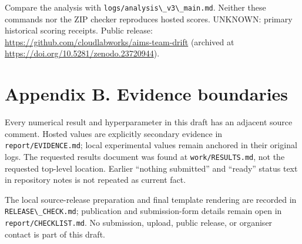 \documentclass{article}
\providecommand{\passthrough}[1]{#1}
\begin{document}
Compare the analysis with \passthrough{\lstinline!logs/analysis\_v3\_main.md!}. Neither these commands nor the ZIP checker reproduces hosted scores. UNKNOWN: primary historical scoring receipts. Public release: \url{https://github.com/cloudlabworks/aims-team-drift} (archived at \url{https://doi.org/10.5281/zenodo.23720944}).

\section{Appendix B. Evidence boundaries}\label{appendix-b.-evidence-boundaries}

Every numerical result and hyperparameter in this draft has an adjacent source comment. Hosted values are explicitly secondary evidence in \passthrough{\lstinline!report/EVIDENCE.md!}; local experimental values remain anchored in their original logs. The requested results document was found at \passthrough{\lstinline!work/RESULTS.md!}, not the requested top-level location. Earlier ``nothing submitted'' and ``ready'' status text in repository notes is not repeated as current fact.

The local source-release preparation and final template rendering are recorded in \passthrough{\lstinline!RELEASE\_CHECK.md!}; publication and submission-form details remain open in \passthrough{\lstinline!report/CHECKLIST.md!}. No submission, upload, public release, or organiser contact is part of this draft.
\end{document}
